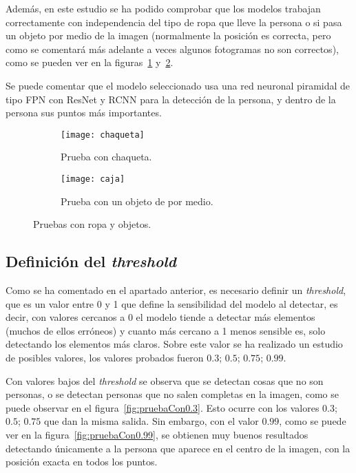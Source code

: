 {Además, en este estudio se ha podido comprobar que los modelos trabajan correctamente con independencia del tipo de ropa que lleve la persona o si pasa un objeto por medio de la imagen (normalmente la posición es correcta, pero como se comentará más adelante a veces algunos fotogramas no son correctos), como se pueden ver en la figuras~\ref{fig:chaqueta} y~\ref{fig:caja}.

Se puede comentar que el modelo seleccionado usa una red neuronal piramidal de tipo FPN con ResNet y RCNN para la detección de la persona, y dentro de la persona sus puntos más importantes.

\begin{figure}[ht]
	\begin{subfigure}{.48\textwidth}
		\centering
		\texttt{[image: chaqueta]}
		\caption{Prueba con chaqueta.}
		\label{fig:chaqueta}
	\end{subfigure}
	\begin{subfigure}{.48\textwidth}
		\centering
		\texttt{[image: caja]}
		\caption{Prueba con un objeto de por medio.}
		\label{fig:caja}
	\end{subfigure}
	\caption{Pruebas con ropa y objetos.}
	\label{fig:ropobj}
\end{figure}



\subsection{Definición del \textit{threshold}}
Como se ha comentado en el apartado anterior, es necesario definir un \textit{threshold}, que es un valor entre 0 y 1 que define la sensibilidad del modelo al detectar, es decir, con valores cercanos a 0 el modelo tiende a detectar más elementos (muchos de ellos erróneos) y cuanto más cercano a 1 menos sensible es, solo detectando los elementos más claros. Sobre este valor se ha realizado un estudio de posibles valores, los valores probados fueron $0.3$; $0.5$; $0.75$; $0.99$.

Con valores bajos del \textit{threshold} se observa que se detectan cosas que no son personas, o se detectan personas que no salen completas en la imagen, como se puede observar en el figura~\ref{fig:pruebaCon0.3}. Esto ocurre con los valores $0.3$; $0.5$; $0.75$ que dan la misma salida. Sin embargo, con el valor $0.99$, como se puede ver en la figura~\ref{fig:pruebaCon0.99}, se obtienen muy buenos resultados detectando únicamente a la persona que aparece en el centro de la imagen, con la posición exacta en todos los puntos.

}
